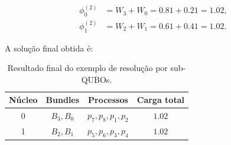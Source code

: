 \begin{equation}
\begin{aligned}
    \phi^{(2)}_0 &= W_3+W_0=0.81+0.21=1.02,\\
    \phi^{(2)}_1 &= W_2+W_1=0.61+0.41=1.02.
\end{aligned}
\end{equation}

A solução final obtida é:

\begin{table}[H]
\centering
\begin{tabular}{|c|c|c|c|}
\hline
\textbf{Núcleo} & \textbf{Bundles} & \textbf{Processos} &
\textbf{Carga total} \\
\hline
0 & $B_3,B_0$ & $p_7,p_8,p_1,p_2$ & $1.02$ \\
1 & $B_2,B_1$ & $p_5,p_6,p_3,p_4$ & $1.02$ \\
\hline
\end{tabular}
\caption{Resultado final do exemplo de resolução por sub-QUBOs.}
\label{tab:resultado-exemplo-subqubos}
\end{table}
